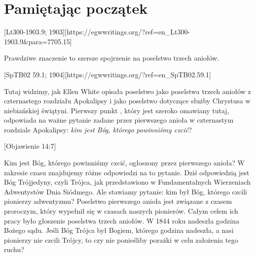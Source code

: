 
\chapter{Pamiętając początek} \label{chap:remembering-the-beginning}

[Lt300-1903.9; 1903][https://egwwritings.org/?ref=en\_Lt300-1903.9&para=7705.15]

Prawdziwe znaczenie  to szersze spojrzenie na poselstwo trzech aniołów.

[SpTB02 59.1; 1904][https://egwwritings.org/?ref=en\_SpTB02.59.1]

Tutaj widzimy, jak Ellen White opisała poselstwo  jako poselstwa trzech aniołów z czternastego rozdziału Apokalipsy i jako poselstwo dotyczące służby Chrystusa w niebiańskiej świątyni. Pierwszy punkt , który jest szeroko omawiany tutaj, odpowiada na ważne pytanie zadane przez pierwszego anioła w czternastym rozdziale Apokalipsy: \textit{kim jest Bóg, którego powinniśmy czcić}?

[Objawienie 14:7]

Kim jest Bóg, którego powinniśmy czcić, ogłoszony przez pierwszego anioła? W zakresie czasu znajdujemy różne odpowiedzi na to pytanie. Dziś odpowiedzią jest Bóg Trójjedyny, czyli Trójca, jak przedstawiono w Fundamentalnych Wierzeniach Adwentystów Dnia Siódmego. Ale stawiamy pytanie: kim był Bóg, którego czcili pionierzy adwentyzmu? Poselstwo pierwszego anioła jest związane z czasem proroczym, który wypełnił się w czasach naszych pionierów. Całym celem ich pracy było głoszenie poselstwa trzech aniołów. W 1844 roku nadeszła godzina Bożego sądu. Jeśli Bóg Trójca był Bogiem, którego godzina nadeszła, a nasi pionierzy nie czcili Trójcy, to czy nie ponieśliby porażki w celu założenia tego ruchu?


